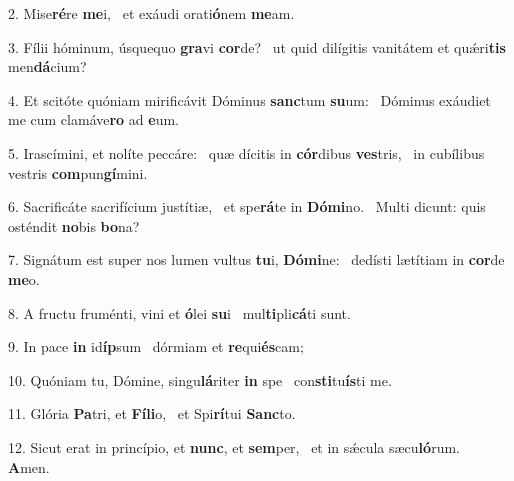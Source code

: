 2. Mise\textbf{ré}re \textbf{me}i, \ast\  et exáudi orati\textbf{ó}nem \textbf{me}am.\

3. Fílii hóminum, úsquequo \textbf{gra}vi \textbf{cor}de? \ast\  ut quid dilígitis vanitátem et quǽri\textbf{tis} men\textbf{dá}cium?\

4. Et scitóte quóniam mirificávit Dóminus \textbf{sanc}tum \textbf{su}um: \ast\  Dóminus exáudiet me cum clamáve\textbf{ro} ad \textbf{e}um.\

5. Irascímini, et nolíte peccáre: \dag\  quæ dícitis in \textbf{cór}dibus \textbf{ves}tris, \ast\  in cubílibus vestris \textbf{com}pun\textbf{gí}mini.\

6. Sacrificáte sacrifícium justítiæ, \dag\  et spe\textbf{rá}te in \textbf{Dó}\textbf{mi}no. \ast\  Multi dicunt: quis osténdit \textbf{no}bis \textbf{bo}na?\

7. Signátum est super nos lumen vultus \textbf{tu}i, \textbf{Dó}\textbf{mi}ne: \ast\  dedísti lætítiam in \textbf{cor}de \textbf{me}o.\

8. A fructu fruménti, vini et \textbf{ó}lei \textbf{su}i \ast\  mul\textbf{ti}pli\textbf{cá}ti sunt.\

9. In pace \textbf{in} id\textbf{íp}sum \ast\  dórmiam et \textbf{re}qui\textbf{és}cam;\

10. Quóniam tu, Dómine, singu\textbf{lá}riter \textbf{in} spe \ast\  con\textbf{sti}tu\textbf{ís}ti me.\

11. Glória \textbf{Pa}tri, et \textbf{Fí}\textbf{li}o, \ast\  et Spi\textbf{rí}tui \textbf{Sanc}to.\

12. Sicut erat in princípio, et \textbf{nunc}, et \textbf{sem}per, \ast\  et in sǽcula sæcu\textbf{ló}rum. \textbf{A}men.\

